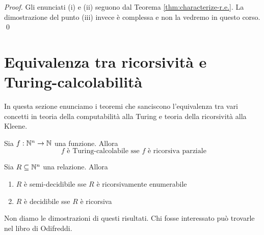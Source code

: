 \documentclass[runningheads,a4paper]{llncs}
\begin{document}
\begin{proof}
Gli enunciati (i) e (ii) seguono dal Teorema \ref{thm:characterize-r.e.}. La dimostrazione del punto (iii) invece \`{e}
 complessa e non la vedremo in questo corso.
\qed\end{proof}

\section{Equivalenza tra ricorsivit\`{a} e Turing-calcolabilit\`{a}}

In questa sezione enunciamo i teoremi che sanciscono l'equivalenza tra vari concetti in teoria della computabilit\`{a}
 alla Turing e teoria della ricorsivit\`{a} alla Kleene.

\begin{theorem}
Sia $f: \mathbb{N}^n \to \mathbb{N}$ una funzione. Allora 
$$ \mbox{ $f$ \`{e} Turing-calcolabile sse $f$ \`{e} ricorsiva parziale } $$ 
\end{theorem}

\begin{theorem}
Sia $R \subseteq \mathbb{N}^n$ una relazione. Allora 
\begin{enumerate}
\item $R$ \`{e} semi-decidibile sse $R$ \`{e} ricorsivamente enumerabile
\item $R$ \`{e} decidibile sse $R$ \`{e} ricorsiva
\end{enumerate}
\end{theorem}
 
Non diamo le dimostrazioni di questi risultati. Chi fosse interessato pu\`{o} trovarle nel libro di Odifreddi.


%
\end{document}
